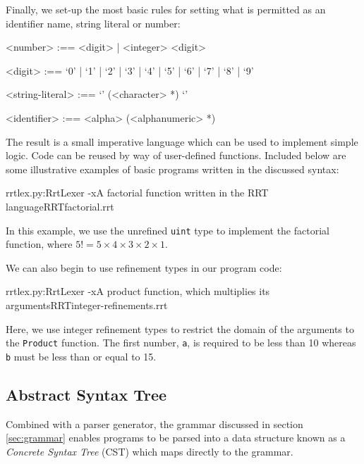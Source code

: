 \documentclass[a4paper,openany,12pt]{book}
\begin{document}
Finally, we set-up the most basic rules for setting what is permitted as an identifier name, string literal or
number:

\begin{grammar}
    <number> :== <digit> | <integer> <digit>

    <digit> :== `0' | `1' | `2' | `3' | `4' | `5' | `6' | `7' | `8' | `9'

    <string-literal> :== `\textquotedbl{}' (<character> *) `\textquotedbl{}'

    <identifier> :== <alpha> (<alphanumeric> *)
\end{grammar}

The result is a small imperative language which can be used to implement simple logic.
Code can be reused by way of user-defined functions.
Included below are some illustrative examples of basic programs written in the discussed syntax:

\begin{mycodefile}{rrtlex.py:RrtLexer -x}{\label{code:rrt:1}A factorial function written in the RRT language}{RRT}{factorial.rrt}
    \vspace{0.5em}

    In this example, we use the unrefined \texttt{uint} type to implement the factorial function, where
    $5! = 5\times 4 \times 3 \times 2 \times 1$.
\end{mycodefile}

We can also begin to use refinement types in our program code:

\begin{mycodefile}{rrtlex.py:RrtLexer -x}{\label{code:rrt:2}A product function, which multiplies its arguments}{RRT}{integer-refinements.rrt}
    \vspace{0.5em}

    Here, we use integer refinement types to restrict the domain of the arguments to the \texttt{Product}
    function.
    The first number, \texttt{a}, is required to be less than 10 whereas \texttt{b} must be less than or equal to 15.
\end{mycodefile}

\label{sec:grammar}

\subsection{Abstract Syntax Tree}

Combined with a parser generator, the grammar discussed in section \ref{sec:grammar} enables programs to be parsed into
a data structure known as a \emph{Concrete Syntax Tree} (CST) which maps directly to the grammar.
\end{document}
